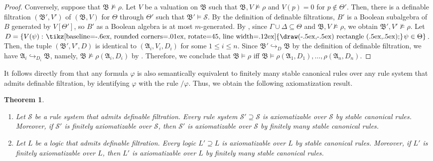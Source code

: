 \documentclass[a4paper,11pt]{article}
\newtheorem{theorem}{Theorem}
\theoremstyle{definition}
\theoremstyle{remark}
\numberwithin{theorem}{section}
\newcommand{\alg}[1]{\mathfrak{#1}}
\newcommand{\A}{\alg{A}}
\newcommand{\B}{\alg{B}}
\newcommand{\class}[1]{\mathcal{#1}}
\renewcommand{\S}{\class{S}}
\renewcommand{\phi}{\varphi}
\newcommand{\gooddiamond}{\hspace{.2ex}\text{%
  \tikz[baseline=-.6ex, rounded corners=.01ex, rotate=45, line width=.12ex]
    {\draw(-.5ex,-.5ex) rectangle (.5ex,.5ex);}}\kern.2ex}
\renewcommand{\Diamond}{\gooddiamond}
\newcommand{\Dia}{\Diamond}
\newcommand{\inj}{\hookrightarrow}
\renewcommand{\S}{\mathcal{S}}
\begin{document}
\begin{proof}
    Conversely, suppose that $\B \not\models \rho$. Let $V$ be a valuation on $\B$ such that $\B, V \not\models \rho$ and $V(p) = 0$ for $p \notin \Theta'$. Then, there is a definable filtration $(\B', V')$ of $(\B, V)$ for $\Theta$ through $\Theta'$ such that $\B' \models \S$. By the definition of definable filtrations, $B'$ is a Boolean subalgebra of $B$ generated by $V[\Theta']$, so $B'$ as a Boolean algebra is at most $m$-generated. By , since $\Gamma \cup \Delta \subseteq \Theta$ and $\B, V \not\models \rho$, we obtain $\B', V' \not\models \rho$. Let $D = \{V(\psi): \Dia\psi \in \Theta\}$. Then, the tuple $(\B', V', D)$ is identical to $(\A_i, V_i, D_i)$ for some $1 \leq i \leq n$. Since $\B' \inj_D \B$ by the definition of definable filtration, we have $\A_i \inj_{D_i} \B$, namely, $\B \not\models \rho(\A_i, D_i)$ by . Therefore, we conclude that $\B \models \rho$ iff $ \B \models\rho(\A_1, D_1), \dots, \rho(\A_n, D_n)$.
\end{proof}

It follows directly from  that any formula $\phi$ is also semantically equivalent to finitely many stable canonical rules over any rule system that admits definable filtration, by identifying $\phi$ with the rule $/\phi$. Thus, we obtain the following axiomatization result.

\begin{theorem} \label{3: Cor scr complete} \leavevmode
    \begin{enumerate}
        \item Let $\S$ be a rule system that admits definable filtration. Every rule system $\S' \supseteq \S$ is axiomatizable over $\S$ by stable canonical rules. Moreover, if $\S'$ is finitely axiomatizable over $\S$, then $\S'$ is axiomatizable over $\S$ by finitely many stable canonical rules.
        \item Let $L$ be a logic that admits definable filtration. Every logic $L' \supseteq L$ is axiomatizable over $L$ by stable canonical rules. Moreover, if $L'$ is finitely axiomatizable over $L$, then $L'$ is axiomatizable over $L$ by finitely many stable canonical rules.
    \end{enumerate}
\end{theorem}
\end{document}
